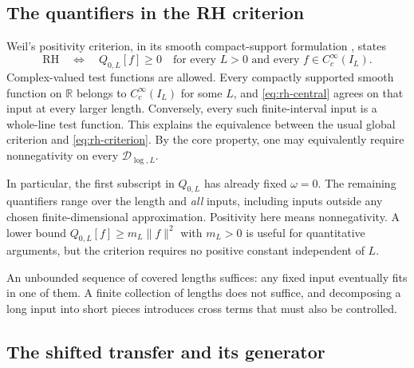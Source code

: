 \subsection{The quantifiers in the RH criterion}
\label{subsec:rh-criterion}

Weil's positivity criterion, in its smooth compact-support formulation
\cite[\S1.1]{SuzukiScrewBackground}, states
\begin{equation}
\boxed{\mathrm{RH}\quad\Longleftrightarrow\quad
Q_{0,L}[f]\geq0
\quad\text{for every }L>0
\text{ and every }f\in C_c^\infty(I_L).}
\label{eq:rh-criterion}
\end{equation}
Complex-valued test functions are allowed. Every compactly supported
smooth function on $\mathbb R$ belongs to $C_c^\infty(I_L)$ for some
$L$, and \eqref{eq:rh-central} agrees on that input at every larger
length. Conversely, every such finite-interval input is a whole-line
test function. This explains the equivalence between the usual global
criterion and \eqref{eq:rh-criterion}. By the core property, one may
equivalently require nonnegativity on every $\mathcal D_{\log,L}$.

In particular, the first subscript in $Q_{0,L}$ has already fixed
$\omega=0$. The remaining quantifiers range over the length and
\emph{all} inputs, including inputs outside any chosen finite-dimensional
approximation. Positivity here means nonnegativity. A lower bound
$Q_{0,L}[f]\geq m_L\lVert f\rVert^2$ with $m_L>0$ is useful for
quantitative arguments, but the criterion requires no positive constant
independent of $L$.

An unbounded sequence of covered lengths suffices: any fixed input
eventually fits in one of them. A finite collection of lengths does not
suffice, and decomposing a long input into short pieces introduces cross
terms that must also be controlled.

\subsection{The shifted transfer and its generator}
\label{subsec:rh-shift}


